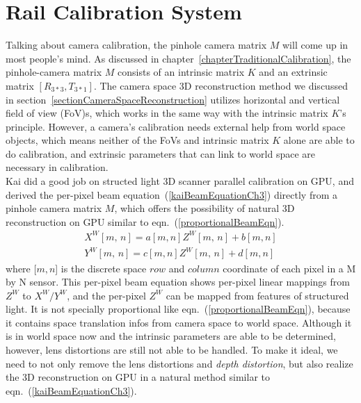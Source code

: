 \section{Rail Calibration System}

Talking about camera calibration, the pinhole camera matrix \(M\) will come up in most people's mind. As discussed in chapter~\ref{chapterTraditionalCalibration}, the pinhole-camera matrix \(M\) consists of an intrinsic matrix \(K\) and an extrinsic matrix \([R_{3*3}, T_{3*1}]\). The camera space 3D reconstruction method we discussed in section~\ref{sectionCameraSpaceReconstruction} utilizes horizontal and vertical field of view (FoV)s, which works in the same way with the intrinsic matrix \(K\)'s principle. However, a camera's calibration needs external help from world space objects, which means neither of the FoVs and intrinsic matrix \(K\) alone are able to do calibration,  and extrinsic parameters that can link to world space are necessary in calibration. 
\\\indent
Kai \cite{Kai10} did a good job on structed light 3D scanner parallel calibration on GPU, and derived the per-pixel beam equation~(\ref{kaiBeamEquationCh3}) directly from a pinhole camera matrix \(M\), which offers the possibility of natural 3D reconstruction on GPU similar to eqn.~(\ref{proportionalBeamEqn}).
%
\begin{equation}
\begin{aligned}
X^W[m,\,  n] = a[m, n]Z^W[m,\,  n]+b[m, n]
\\%
Y^W[m,\,  n] = c[m, n]Z^W[m,\,  n]+d[m, n]
\end{aligned}
\label{kaiBeamEquationCh3}
\end{equation}%
\noindent
where [\(m,n\)] is the discrete space \(row\) and \(column\) coordinate of each pixel in a M by N sensor. This per-pixel beam equation shows per-pixel linear mappings from \(Z^W\) to \(X^W/Y^W\), and the per-pixel \(Z^W\) can be mapped from features of structured light. It is not specially proportional like eqn.~(\ref{proportionalBeamEqn}), because it contains space translation infos from camera space to world space. Although it is in world space now and the intrinsic parameters are able to be determined, however, lens distortions are still not able to be handled. To make it ideal, we need to not only remove the lens distortions and \emph{depth distortion}, but also realize the 3D reconstruction on GPU in a natural method similar to eqn.~(\ref{kaiBeamEquationCh3}).
